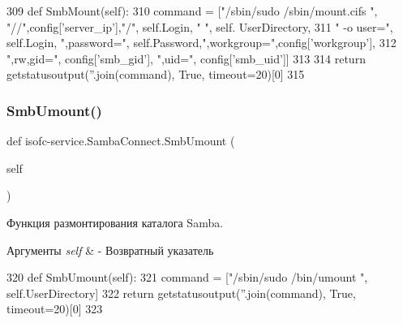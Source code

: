 \begin{DoxyCode}
309     \textcolor{keyword}{def }SmbMount(self):
310         command = [\textcolor{stringliteral}{"/sbin/sudo /sbin/mount.cifs "}, \textcolor{stringliteral}{"//"},config[\textcolor{stringliteral}{'server\_ip'}],\textcolor{stringliteral}{"/"}, self.Login, \textcolor{stringliteral}{" "}, self.
      UserDirectory,
311                 \textcolor{stringliteral}{" -o user="}, self.Login, \textcolor{stringliteral}{",password="}, self.Password,\textcolor{stringliteral}{",workgroup="},config[\textcolor{stringliteral}{'workgroup'}],
312                 \textcolor{stringliteral}{",rw,gid="}, config[\textcolor{stringliteral}{'smb\_gid'}], \textcolor{stringliteral}{",uid="}, config[\textcolor{stringliteral}{'smb\_uid'}]]
313 
314         \textcolor{keywordflow}{return} getstatusoutput(\textcolor{stringliteral}{''}.join(command), \textcolor{keyword}{True}, timeout=20)[0]
315 
\end{DoxyCode}
\mbox{\label{classisofc-service_1_1SambaConnect_a3979f8cc410218f1a71d44f340d1cdf8}} 
\subsubsection{\texorpdfstring{Smb\+Umount()}{SmbUmount()}}
{\footnotesize\ttfamily def isofc-\/service.\+Samba\+Connect.\+Smb\+Umount (\begin{DoxyParamCaption}\item[{}]{self }\end{DoxyParamCaption})}



Функция размонтирования каталога Samba. 


\begin{DoxyParams}{Аргументы}
{\em self} & -\/ Возвратный указатель \\
\hline
\end{DoxyParams}

\begin{DoxyCode}
320     \textcolor{keyword}{def }SmbUmount(self):
321         command = [\textcolor{stringliteral}{"/sbin/sudo /bin/umount "}, self.UserDirectory]
322         \textcolor{keywordflow}{return} getstatusoutput(\textcolor{stringliteral}{''}.join(command), \textcolor{keyword}{True}, timeout=20)[0]
323 
\end{DoxyCode}
\mbox{\label{classisofc-service_1_1SambaConnect_aeaa767a173ce5e1f7d92770d53b7878d}} 
